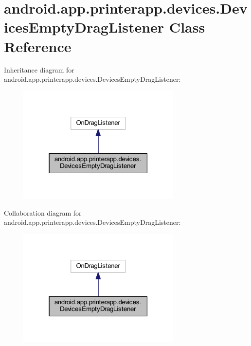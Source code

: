 \hypertarget{classandroid_1_1app_1_1printerapp_1_1devices_1_1_devices_empty_drag_listener}{}\section{android.\+app.\+printerapp.\+devices.\+Devices\+Empty\+Drag\+Listener Class Reference}
\label{classandroid_1_1app_1_1printerapp_1_1devices_1_1_devices_empty_drag_listener}


Inheritance diagram for android.\+app.\+printerapp.\+devices.\+Devices\+Empty\+Drag\+Listener\+:
\nopagebreak
\begin{figure}[H]
\begin{center}
\leavevmode
\includegraphics[width=231pt]{classandroid_1_1app_1_1printerapp_1_1devices_1_1_devices_empty_drag_listener__inherit__graph}
\end{center}
\end{figure}


Collaboration diagram for android.\+app.\+printerapp.\+devices.\+Devices\+Empty\+Drag\+Listener\+:
\nopagebreak
\begin{figure}[H]
\begin{center}
\leavevmode
\includegraphics[width=231pt]{classandroid_1_1app_1_1printerapp_1_1devices_1_1_devices_empty_drag_listener__coll__graph}
\end{center}
\end{figure}
